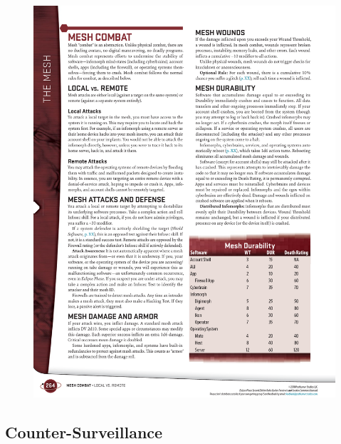 \begin{figure}[htb!]%
   \centering
   \includegraphics[scale=1.0]{gfx/mesh-combat}%
\end{figure}%


\subsection*{Counter-Surveillance}

